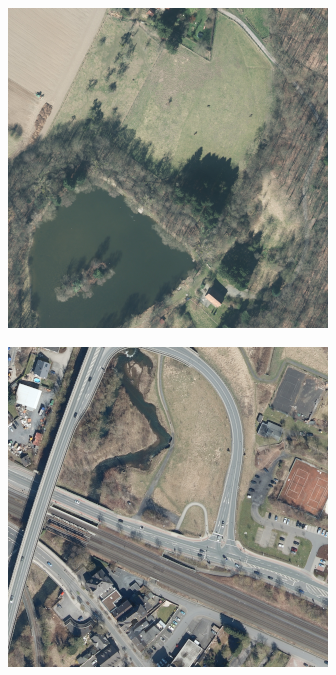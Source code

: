 \begin{figure}
\begin{subfigure}{\DopLabelImageWidth}
        \includegraphics[width=\textwidth]{images/583_image}
    \end{subfigure}
    \hfill
    \begin{subfigure}{\DopLabelImageWidth}
        \includegraphics[width=\textwidth]{images/2281_image}

\end{subfigure}
\end{figure}
